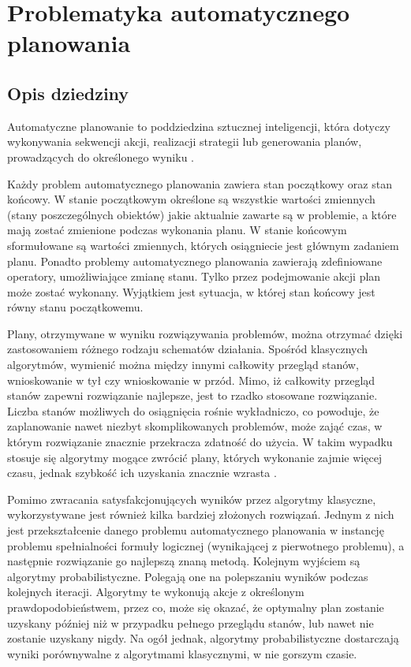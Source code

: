 \chapter{Problematyka automatycznego planowania}
 \section{Opis dziedziny}
Automatyczne planowanie to poddziedzina sztucznej inteligencji, która dotyczy wykonywania sekwencji akcji, realizacji strategii lub generowania planów, prowadzących do określonego wyniku \cite{planning}.

Każdy problem automatycznego planowania zawiera stan początkowy oraz stan końcowy. W stanie początkowym określone są wszystkie wartości zmiennych (stany poszczególnych obiektów) jakie aktualnie zawarte są w problemie, a które mają zostać zmienione podczas wykonania planu. W stanie końcowym sformułowane są wartości zmiennych, których osiągniecie jest głównym zadaniem planu. Ponadto problemy automatycznego planowania zawierają zdefiniowane operatory, umożliwiające zmianę stanu. Tylko przez podejmowanie akcji plan może zostać wykonany. Wyjątkiem jest sytuacja, w której stan końcowy jest równy stanu początkowemu.

Plany, otrzymywane w wyniku rozwiązywania problemów, można otrzymać dzięki zastosowaniem różnego rodzaju schematów działania. Spośród klasycznych algorytmów, wymienić można między innymi całkowity przegląd stanów, wnioskowanie w tył czy wnioskowanie w przód. Mimo, iż całkowity przegląd stanów zapewni rozwiązanie najlepsze, jest to rzadko stosowane rozwiązanie. Liczba stanów możliwych do osiągnięcia rośnie wykładniczo, co powoduje, że zaplanowanie nawet niezbyt skomplikowanych problemów, może zająć czas, w którym rozwiązanie znacznie przekracza zdatność do użycia. W takim wypadku stosuje się algorytmy mogące zwrócić plany, których wykonanie zajmie więcej czasu, jednak szybkość ich uzyskania znacznie wzrasta \cite{fdalgorytm}.

Pomimo zwracania satysfakcjonujących wyników przez algorytmy klasyczne, wykorzystywane jest również kilka bardziej złożonych rozwiązań. Jednym z nich jest przekształcenie danego problemu automatycznego planowania w instancję problemu spełnialności formuły logicznej (wynikającej z pierwotnego problemu), a następnie  rozwiązanie go najlepszą znaną metodą. Kolejnym wyjściem są algorytmy probabilistyczne. Polegają one na polepszaniu wyników podczas kolejnych iteracji. Algorytmy te wykonują akcje z określonym prawdopodobieństwem, przez co, może się okazać, że optymalny plan zostanie uzyskany później niż w przypadku pełnego przeglądu stanów, lub nawet nie zostanie uzyskany nigdy. Na ogół jednak, algorytmy probabilistyczne dostarczają wyniki porównywalne z algorytmami klasycznymi, w nie gorszym czasie.

